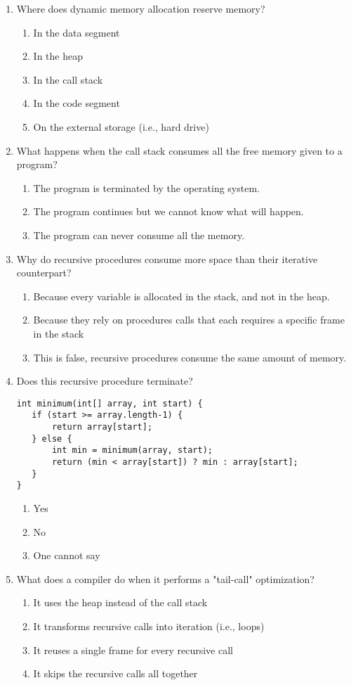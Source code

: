 \documentclass[11pt]{article}
\begin{document}
\begin{enumerate}
\item Where does dynamic memory allocation reserve memory?
\begin{enumerate}
\item In the data segment
\item In the heap
\item In the call stack
\item In the code segment
\item On the external storage (i.e., hard drive)
\end{enumerate}

\item What happens when the call stack consumes all the free memory given
to a program?
\begin{enumerate}
\item The program is terminated by the operating system.
\item The program continues but we cannot know what will happen.
\item The program can never consume all the memory.
\end{enumerate}

\item Why do recursive procedures consume more space than their iterative
counterpart?
\begin{enumerate}
\item Because every variable is allocated in the stack, and not in the
heap.
\item Because they rely on procedures calls that each requires a
specific frame in the stack
\item This is false, recursive procedures consume the same amount of
memory.
\end{enumerate}

\item Does this recursive procedure terminate?
\begin{verbatim}
int minimum(int[] array, int start) {
   if (start >= array.length-1) {
       return array[start];
   } else {
       int min = minimum(array, start);
       return (min < array[start]) ? min : array[start];
   }
}
\end{verbatim}
\begin{enumerate}
\item Yes
\item No
\item One cannot say
\end{enumerate}

\item What does a compiler do when it performs a "tail-call" optimization?
\begin{enumerate}
\item It uses the heap instead of the call stack
\item It transforms recursive calls into iteration (i.e., loops)
\item It reuses a single frame for every recursive call
\item It skips the recursive calls all together
\end{enumerate}


\end{enumerate}
\end{document}
